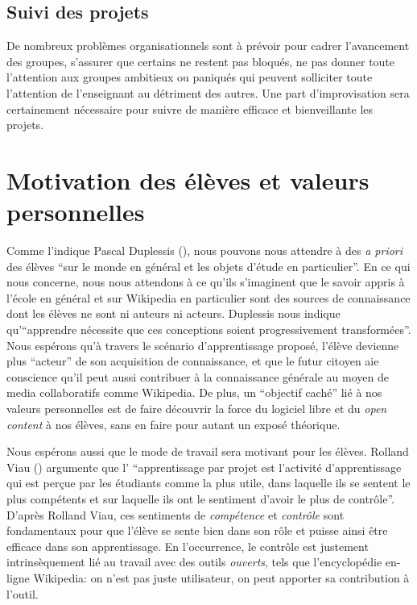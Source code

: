 \documentclass[11pt,bibliography=totoc]{scrartcl}
\begin{document}
\subsection{Suivi des projets}
De nombreux problèmes organisationnels sont à prévoir pour cadrer l'avancement
des groupes, s'assurer que certains ne restent pas bloqués, ne pas donner toute
l'attention aux groupes ambitieux ou paniqués qui peuvent solliciter toute
l'attention de l'enseignant au détriment des autres.  Une part d'improvisation
sera certainement nécessaire pour suivre de manière efficace et bienveillante
les projets.

\section{Motivation des élèves et valeurs personnelles}
Comme l'indique Pascal Duplessis (\cite{duplessis}), nous pouvons nous attendre
à des \textit{a priori} des élèves ``sur le monde en général et les objets
d'étude en particulier''. En ce qui nous concerne, nous nous attendons à ce
qu'ils s'imaginent que le savoir appris à l'école en général et sur Wikipedia en
particulier sont des sources de connaissance dont les élèves ne sont ni auteurs
ni acteurs. Duplessis nous indique qu'``apprendre nécessite que ces conceptions
soient progressivement transformées''. Nous espérons qu'à travers le scénario
d'apprentissage proposé, l'élève devienne plus ``acteur'' de son acquisition de
connaissance, et que le futur citoyen aie conscience qu'il peut aussi contribuer
à la connaissance générale au moyen de media collaboratifs comme Wikipedia.  De
plus, un ``objectif caché'' lié à nos valeurs personnelles est de faire
découvrir la force du logiciel libre et du \textit{open content} à nos élèves,
sans en faire pour autant un exposé théorique.
 
Nous espérons aussi que le mode de travail sera motivant pour les
élèves. Rolland Viau (\cite{viau}) argumente que l' ``apprentissage par projet
est l'activité d'apprentissage qui est perçue par les étudiants comme la plus
utile, dans laquelle ils se sentent le plus compétents et sur laquelle ils ont
le sentiment d'avoir le plus de contrôle''. D'après Rolland Viau, ces sentiments
de \textit{compétence} et \textit{contrôle} sont fondamentaux pour que l'élève
se sente bien dans son rôle et puisse ainsi être efficace dans son
apprentissage.  En l'occurrence, le contrôle est justement intrinsèquement lié
au travail avec des outils \textit{ouverts}, tels que l'encyclopédie en-ligne
Wikipedia: on n'est pas juste utilisateur, on peut apporter sa contribution à
l'outil.
\end{document}
